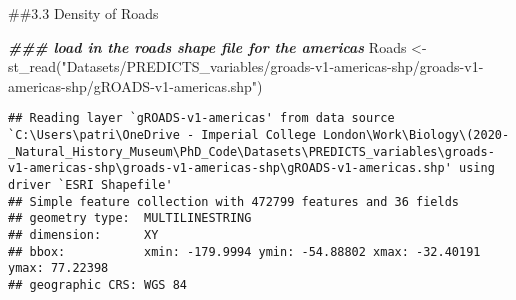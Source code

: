 \documentclass[
]{article}
\newenvironment{Shaded}{\begin{snugshade}}{\end{snugshade}}
\newcommand{\AttributeTok}[1]{\textcolor[rgb]{0.77,0.63,0.00}{#1}}
\newcommand{\DocumentationTok}[1]{\textcolor[rgb]{0.56,0.35,0.01}{\textbf{\textit{#1}}}}
\newcommand{\FunctionTok}[1]{\textcolor[rgb]{0.00,0.00,0.00}{#1}}
\newcommand{\NormalTok}[1]{#1}
\newcommand{\OtherTok}[1]{\textcolor[rgb]{0.56,0.35,0.01}{#1}}
\newcommand{\SpecialCharTok}[1]{\textcolor[rgb]{0.00,0.00,0.00}{#1}}
\newcommand{\StringTok}[1]{\textcolor[rgb]{0.31,0.60,0.02}{#1}}
\begin{document}
\begin{Shaded}
\end{Shaded}

\#\#3.3 Density of Roads

\begin{Shaded}
\begin{Highlighting}[]
\DocumentationTok{\#\#\# load in the roads shape file for the americas}
\NormalTok{Roads }\OtherTok{\textless{}{-}} \FunctionTok{st\_read}\NormalTok{(}\StringTok{"Datasets/PREDICTS\_variables/groads{-}v1{-}americas{-}shp/groads{-}v1{-}americas{-}shp/gROADS{-}v1{-}americas.shp"}\NormalTok{)}
\end{Highlighting}
\end{Shaded}

\begin{verbatim}
## Reading layer `gROADS-v1-americas' from data source `C:\Users\patri\OneDrive - Imperial College London\Work\Biology\(2020-_Natural_History_Museum\PhD_Code\Datasets\PREDICTS_variables\groads-v1-americas-shp\groads-v1-americas-shp\gROADS-v1-americas.shp' using driver `ESRI Shapefile'
## Simple feature collection with 472799 features and 36 fields
## geometry type:  MULTILINESTRING
## dimension:      XY
## bbox:           xmin: -179.9994 ymin: -54.88802 xmax: -32.40191 ymax: 77.22398
## geographic CRS: WGS 84
\end{verbatim}
\end{document}

